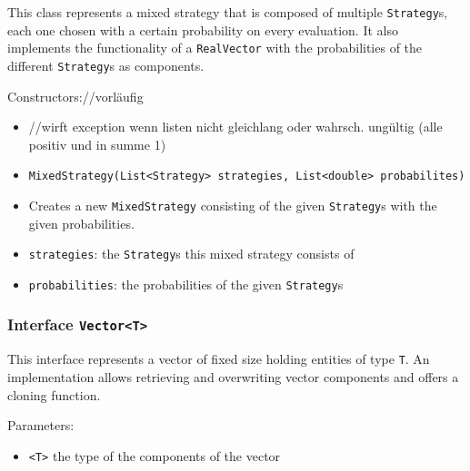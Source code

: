 \documentclass[parskip=full,11pt]{scrartcl}
\begin{document}
This class represents a mixed strategy that is composed of multiple \texttt{Strategy}s, each one chosen with a certain probability on every evaluation. It also implements the functionality of a \texttt{RealVector} with the probabilities of the different \texttt{Strategy}s as components.

Constructors://vorläufig
\begin{itemize}\itemsep -10pt
\item[] //wirft exception wenn listen nicht gleichlang oder wahrsch. ungültig (alle positiv und in summe 1)
\item \texttt{MixedStrategy(List<Strategy> strategies, List<double> probabilites)}
\item[] Creates a new \texttt{MixedStrategy} consisting of the given \texttt{Strategy}s with the given probabilities.
\item[] \texttt{strategies}: the \texttt{Strategy}s this mixed strategy consists of
\item[] \texttt{probabilities}: the probabilities of the given \texttt{Strategy}s
\end{itemize}

\subsubsection{Interface \texttt{Vector<T>}}
This interface represents a vector of fixed size holding entities of type \texttt{T}. An implementation allows retrieving and overwriting vector components and offers a cloning function.

Parameters:
\begin{itemize}\itemsep -10pt
\item \texttt{<T>} the type of the components of the vector
\end{itemize}
\end{document}
